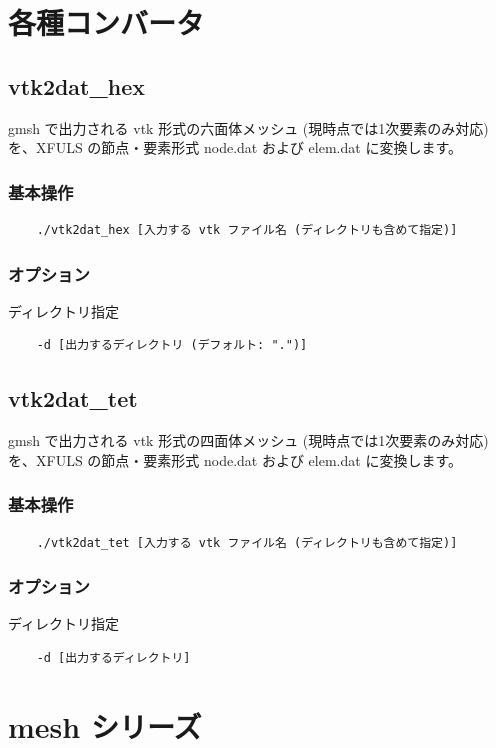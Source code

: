 \documentclass[8pt,a4paper]{article}
\begin{document}
\section{各種コンバータ}
\subsection{vtk2dat\_hex}
gmsh で出力される vtk 形式の六面体メッシュ (現時点では1次要素のみ対応) を、XFULS の節点・要素形式 node.dat および elem.dat に変換します。

\subsubsection*{基本操作}
\begin{verbatim}
	./vtk2dat_hex [入力する vtk ファイル名 (ディレクトリも含めて指定)]
\end{verbatim}

\subsubsection*{オプション}
ディレクトリ指定
\begin{verbatim}
    -d [出力するディレクトリ (デフォルト: ".")]
\end{verbatim}

\subsection{vtk2dat\_tet}
gmsh で出力される vtk 形式の四面体メッシュ (現時点では1次要素のみ対応) を、XFULS の節点・要素形式 node.dat および elem.dat に変換します。

\subsubsection*{基本操作}
\begin{verbatim}
	./vtk2dat_tet [入力する vtk ファイル名 (ディレクトリも含めて指定)]
\end{verbatim}

\subsubsection*{オプション}
ディレクトリ指定
\begin{verbatim}
    -d [出力するディレクトリ]
\end{verbatim}

\section{mesh シリーズ}
\end{document}
